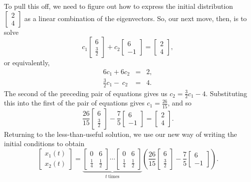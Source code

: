 \documentclass[../book.tex]{subfiles}
\begin{document}
To pull this off, we need to figure out how to express the initial distribution \(\begin{bmatrix} 2 \\ 4\end{bmatrix}\) as a linear combination of the eigenvectors. So, our next move, then, is to solve
\begin{equation}\label{eq:eig-36}
c_1 
\begin{bmatrix}
  6 \\ \frac{3}{2}
\end{bmatrix}
+
c_2
\begin{bmatrix}
  6 \\ - 1
\end{bmatrix}
=
\begin{bmatrix}
  2 \\ 4
\end{bmatrix},
\end{equation}
or equivalently,
\begin{equation}\label{eq:eig-37}
\begin{array}{lcl}
  6 c_1 + 6 c_2 &=& 2, \\
  \frac{3}{2} c_1 -\  c_2 &=& 4.
\end{array}
\end{equation}
The second of the preceding pair of equations gives us \(c_2 = \frac{3}{2} c_1 - 4\). Substituting this into the first of the pair of equations gives \(c_1 = \frac{26}{15}\),
and so
\begin{equation}\label{eq:eig-38}
\frac{26}{15}  
\begin{bmatrix}
  6 \\ \frac{3}{2}
\end{bmatrix}
-
\frac{7}{5} 
\begin{bmatrix}
  6 \\ - 1
\end{bmatrix}
=
\begin{bmatrix}
  2 \\ 4
\end{bmatrix}.
\end{equation}
Returning to the less-than-useful solution, we use our new way of writing the initial conditions to obtain
\begin{equation}\label{eq:eig-39}
\begin{bmatrix}
  x_1 (t) \\ x_2(t)
\end{bmatrix}
=
\underbrace{
  \begin{bmatrix}
    0 & 6 \\ \frac{1}{4} & \frac{1}{2}
  \end{bmatrix}
  \cdots
  \begin{bmatrix}
    0 & 6 \\ \frac{1}{4} & \frac{1}{2}
  \end{bmatrix}
}_{t\ \text{times}}
\left(
  \frac{26}{15}  
  \begin{bmatrix}
    6 \\ \frac{3}{2}
  \end{bmatrix}
  -
  \frac{7}{5} 
  \begin{bmatrix}
    6 \\ - 1
  \end{bmatrix}
\right).
\end{equation}
\end{document}

